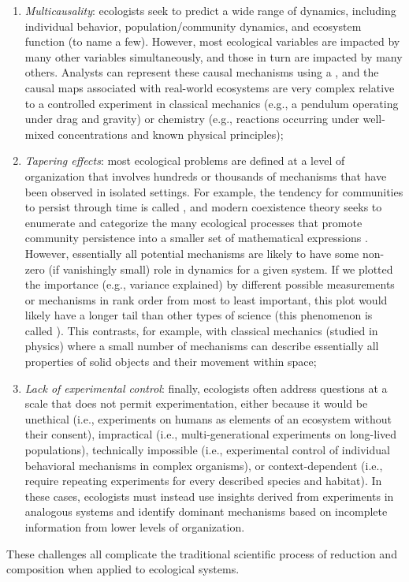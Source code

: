 \begin{enumerate}
    \item \textit{Multicausality}:  ecologists seek to predict a wide range of dynamics, including individual behavior, population/community dynamics, and ecosystem function (to name a few).  However, most ecological variables are impacted by many other variables simultaneously, and those in turn are impacted by many others.  Analysts can represent these causal mechanisms using a  \cite{pearl_causal_2009}, and the causal maps associated with real-world ecosystems are very complex relative to a controlled experiment in classical mechanics (e.g., a pendulum operating under drag and gravity) or chemistry (e.g., reactions occurring under well-mixed concentrations and known physical principles);  
    
    \item \textit{{Tapering effects}}:  most ecological problems are defined at a level of organization that involves hundreds or thousands of mechanisms that have been observed in isolated settings.  For example, the tendency for communities to persist through time is called , and modern coexistence theory seeks to enumerate and categorize the many ecological processes that promote community persistence into a smaller set of mathematical expressions \cite{ellner_expanded_2019}.  However, essentially all potential mechanisms are likely to have some non-zero (if vanishingly small) role in dynamics for a given system. If we plotted the importance (e.g., variance explained) by different possible measurements or mechanisms in rank order from most to least important, this plot would likely have a longer tail than other types of science (this phenomenon is called  \cite{burnham_multimodel_2004}).  This contrasts, for example, with classical mechanics (studied in physics) where a small number of mechanisms can describe essentially all properties of solid objects and their movement within space;     

    \item \textit{Lack of experimental control}:  finally, ecologists often address questions at a scale that does not permit experimentation, either because it would be unethical (i.e., experiments on humans as elements of an ecosystem without their consent), impractical (i.e., multi-generational experiments on long-lived populations), technically impossible (i.e., experimental control of individual behavioral mechanisms in complex organisms), or context-dependent (i.e., require repeating experiments for every described species and habitat).  In these cases, ecologists must instead use insights derived from experiments in analogous systems and identify dominant mechanisms based on incomplete information from lower levels of organization.
\end{enumerate}
These challenges all complicate the traditional scientific process of reduction and composition when applied to ecological systems.  


